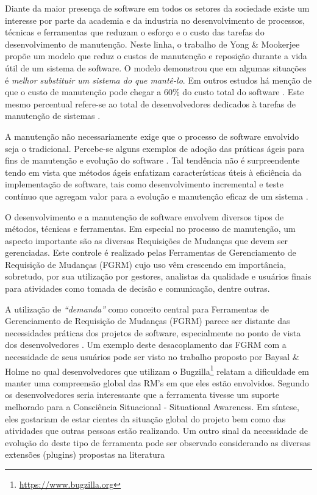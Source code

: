 \documentclass[msc,proposal,hidelot,hideabstract]{ppgccufmg} %
\begin{document}
Diante da maior presença de software em todos os setores da sociedade
existe um interesse por parte da academia e da industria no desenvolvimento de
processos, técnicas e ferramentas que reduzam o esforço e o custo das tarefas
do desenvolvimento de manutenção. Neste linha, o trabalho de Yong \& Mookerjee \cite{1423995}  propõe um modelo que reduz o custos de manutenção e reposição durante a vida útil de um sistema de software. O modelo demonstrou que em algumas situações é \textit{melhor substituir um sistema do que mantê-lo}. Em outros estudos há menção de que o custo de manutenção pode chegar a 60\% do custo total do software \cite{kaur2015review}. Este mesmo percentual refere-se ao total de desenvolvedores dedicados à tarefas de manutenção de sistemas \cite{Zhang_2003}.

A manutenção não necessariamente exige que o processo de software envolvido
seja o tradicional. Percebe-se alguns exemplos de adoção das práticas ágeis
para fins de manutenção e evolução do software \cite{kajko2009model}. Tal
tendência não é surpreendente tendo em vista que métodos ágeis enfatizam
características úteis à eficiência da implementação de software, tais como desenvolvimento incremental e teste contínuo que agregam valor para a evolução e manutenção eficaz de um sistema
\cite{thomas2006agile}.

O desenvolvimento e a manutenção de software envolvem diversos tipos de métodos,
técnicas e ferramentas. Em especial no processo de manutenção, um aspecto
importante são as diversas Requisições de Mudanças que devem ser
gerenciadas. Este controle é realizado pelas Ferramentas de Gerenciamento de Requisição de Mudanças (FGRM) cujo uso vêm crescendo em importância, sobretudo, por sua utilização por gestores, analistas da qualidade e usuários finais para atividades como tomada de decisão e comunicação, dentre outras.

A utilização de  \textit{``demanda''} como conceito central para Ferramentas de Gerenciamento de Requisição de Mudanças (FGRM) parece ser distante das necessidades práticas dos projetos de software, especialmente no ponto de vista dos desenvolvedores \cite{Baysal:2013:SAP:2486788.2486957}. Um exemplo deste desacoplamento das FGRM com a necessidade de seus usuários pode ser visto no trabalho proposto por Baysal \& Holme \cite{baysal2012qualitative} no qual desenvolvedores que utilizam o Bugzilla\footnote{\url{https://www.bugzilla.org}} relatam a
dificuldade em manter uma compreensão global das RM's em que eles estão
envolvidos. Segundo os desenvolvedores seria interessante que a ferramenta
tivesse um suporte melhorado para a Consciência Situacional - Situational
Awareness. Em síntese, eles gostariam de estar cientes da situação global do
projeto bem como das atividades que outras pessoas estão realizando. Um outro
sinal da necessidade de evolução do deste tipo de ferramenta pode ser observado considerando as diversas extensões (plugins) propostas na literatura \cite{101186,Thung:2014:BIT:2635868.2661678,Kononenko:2014:DED:2591062.2591075}
\end{document}
